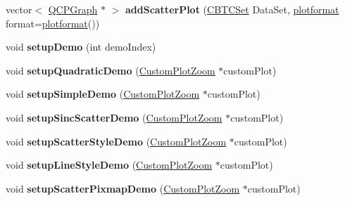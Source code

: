 \begin{DoxyCompactItemize}
\item 
\mbox{\label{classplot_window_a6a55923749ca45728b4ba73a87273082}} 
vector$<$ \hyperlink{class_q_c_p_graph}{Q\+C\+P\+Graph} $\ast$ $>$ {\bfseries add\+Scatter\+Plot} (\hyperlink{class_c_b_t_c_set}{C\+B\+T\+C\+Set} Data\+Set, \hyperlink{structplotformat}{plotformat} format=\hyperlink{structplotformat}{plotformat}())
\item 
\mbox{\label{classplot_window_ade44370e5cd2646dce0e57056aaa8bd3}} 
void {\bfseries setup\+Demo} (int demo\+Index)
\item 
\mbox{\label{classplot_window_aac95a46d0a4633d6425af9129754aa39}} 
void {\bfseries setup\+Quadratic\+Demo} (\hyperlink{class_custom_plot_zoom}{Custom\+Plot\+Zoom} $\ast$custom\+Plot)
\item 
\mbox{\label{classplot_window_a5e8d0a58e982a2ee833aebca2cc7e65d}} 
void {\bfseries setup\+Simple\+Demo} (\hyperlink{class_custom_plot_zoom}{Custom\+Plot\+Zoom} $\ast$custom\+Plot)
\item 
\mbox{\label{classplot_window_a5e1b6d6cdfa829cef6cbc54da054b5cd}} 
void {\bfseries setup\+Sinc\+Scatter\+Demo} (\hyperlink{class_custom_plot_zoom}{Custom\+Plot\+Zoom} $\ast$custom\+Plot)
\item 
\mbox{\label{classplot_window_aeb5102c5042301503a6f6a3f8dc1ffbf}} 
void {\bfseries setup\+Scatter\+Style\+Demo} (\hyperlink{class_custom_plot_zoom}{Custom\+Plot\+Zoom} $\ast$custom\+Plot)
\item 
\mbox{\label{classplot_window_af744193bf71613185311ba739304f410}} 
void {\bfseries setup\+Line\+Style\+Demo} (\hyperlink{class_custom_plot_zoom}{Custom\+Plot\+Zoom} $\ast$custom\+Plot)
\item 
\mbox{\label{classplot_window_aa0c47f80ff816d9dd2e9ce4a08d44f43}} 
void {\bfseries setup\+Scatter\+Pixmap\+Demo} (\hyperlink{class_custom_plot_zoom}{Custom\+Plot\+Zoom} $\ast$custom\+Plot)
\item 
\mbox{\label{classplot_window_a4dad71c1688a9179b05f798675aa5393}} 

\end{DoxyCompactItemize}
